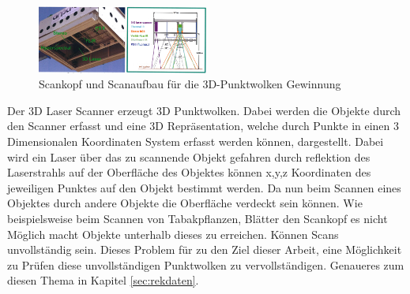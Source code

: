 \documentclass{llncs}
\begin{document}
\begin{figure}[htbp] 
	\centering
	\includegraphics[width=0.5\textwidth]{lematech_2.png}
	\caption{Scankopf und Scanaufbau für die 3D-Punktwolken Gewinnung}
	\label{fig:Bild9}
\end{figure}

Der 3D Laser Scanner erzeugt 3D Punktwolken. Dabei werden die Objekte durch den Scanner erfasst und eine 3D Repräsentation, welche durch Punkte in einen 3 Dimensionalen Koordinaten System erfasst werden können, dargestellt. Dabei wird ein Laser über das zu scannende Objekt gefahren durch reflektion des Laserstrahls auf der Oberfläche des Objektes können x,y,z Koordinaten des jeweiligen Punktes auf den Objekt bestimmt werden. Da nun beim Scannen eines Objektes durch andere Objekte die Oberfläche verdeckt sein können. Wie beispielsweise beim Scannen von Tabakpflanzen, Blätter den Scankopf es nicht Möglich macht Objekte unterhalb dieses zu erreichen. Können Scans unvollständig sein. Dieses Problem für zu den Ziel dieser Arbeit, eine Möglichkeit zu Prüfen diese unvollständigen Punktwolken zu vervollständigen. Genaueres zum diesen Thema in Kapitel \ref{sec:rekdaten}. 

\newpage
\end{document}
